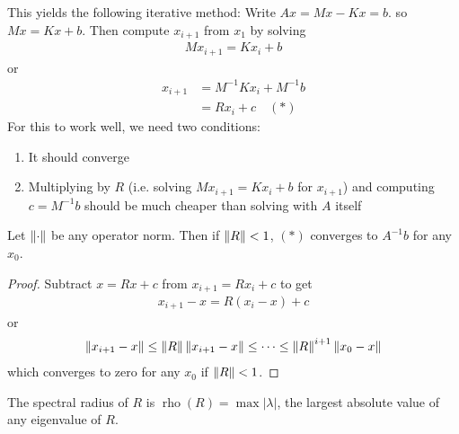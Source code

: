 \documentclass[11pt]{article}
\numberwithin{equation}{section}
\begin{document}
This yields the following iterative method: Write $A x = M x - K x = b$.
so $M x=K x+b$. Then compute $x_{i+1}$ from $x_1$ by solving \begin{align*}
    M x_{i+1}=Kx_{i}+b
\end{align*}
or \begin{align*}
    x_{i+1} &=M^{-1}Kx_{i}+M^{-1}b \\
    &= Rx_i + c \quad (*)
\end{align*}
For this to work well, we need two conditions:\begin{enumerate}
    \item It should converge
    \item Multiplying by $R$ (i.e. solving $M x_{i+1}=Kx_{i}+b$ for $x_{i+1}$) and computing $c = M^{-1}b$ should be much cheaper than solving with $A$ itself
\end{enumerate}

\begin{lemma}
    Let $\left\| \cdot \right\|$ be any operator norm. Then if $\left\| R \right\|<1$, $(*)$ converges to $A^{-1}b$ for any $x_0$.
    \begin{proof}
        Subtract $x = Rx + c$ from $x_{i+1} = Rx_i+c$ to get \begin{align*}
            x_{i+1} - x = R(x_i-x)+c
        \end{align*}
        or \begin{align*}
            \left\| x_{i+1} - x \right\| \leq \left\| R \right\| \left\| x_{i+1} - x \right\| \leq \cdots \leq \left\| R \right\|^{i+1} \left\| x_{0} - x \right\|
        \end{align*}
        which converges to zero for any $x_0$ if $\left\| R \right\|<1$.
    \end{proof}
\end{lemma}

\begin{definition}
    The spectral radius of $R$ is $\operatorname{rho}(R) = \max |\lambda|$, the largest absolute value of any eigenvalue of $R$.
\end{definition}
\end{document}
